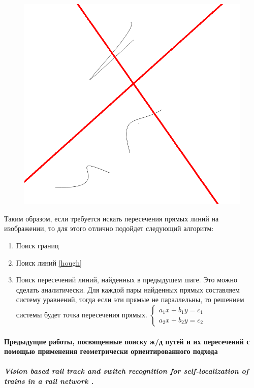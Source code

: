 \begin{enumerate}
\begin{figure}[!h]
\begin{minipage}{0.45\textwidth}
			\caption[Y]{}
			\label{fig:canny_ex}
		\end{minipage}
		\begin{minipage}{0.45\textwidth}
			\centering
			\includegraphics[width=0.7\linewidth]{pictures/hough_ex}
			\caption[X]{}
			\label{fig:hough_ex}
		\end{minipage}
	\end{figure}
\end{enumerate}

Таким образом, если требуется искать пересечения прямых линий на изображении, то для этого отлично подойдет следующий алгоритм:
\begin{enumerate}
	\item Поиск границ \cite{b:canny}
	\item Поиск линий \ref{hough}
	\item Поиск пересечений линий, найденных в предыдущем шаге. Это можно сделать аналитически. Для каждой пары найденных прямых составляем систему уравнений, тогда если эти прямые не параллельны, то решением системы будет точка пересечения прямых.
	$
	\begin{cases}
	a_1x + b_1y = c_1 
	\\
	a_2x + b_2y = c_2 
	\end{cases}
	$
\end{enumerate}

\paragraph{Предыдущие работы, посвященные поиску ж/д путей и их пересечений с помощью применения геометрически ориентированного подхода}

\subparagraph{Vision based rail track and switch recognition for self-localization of trains in a rail network \cite{b:hough_work1}.}

